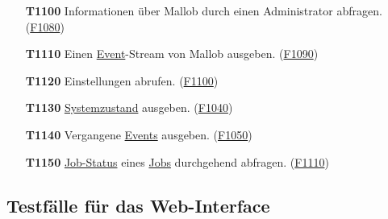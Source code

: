 \begin{itemize}
    \item[\textbf{T1100}] Informationen über \gls{Mallob} durch einen \gls{Administrator} abfragen. (\hyperref[FA:API:Abfragen der Informationen von Mallob]{F1080})
    
    \item[\textbf{T1110}] Einen \hyperref[B:Event]{Event}-\gls{Stream} von \gls{Mallob} ausgeben. (\hyperref[FA:API:Ausgeben eines Event-Streams von Mallob]{F1090})

    \item[\textbf{T1120}] Einstellungen abrufen. (\hyperref[FA:API:Abrufen von Einstellungen]{F1100})
    
    \item[\textbf{T1130}] \hyperref[B:Systemzustand]{Systemzustand} ausgeben. (\hyperref[FA:API:Ausgeben eines Systemzustandes]{F1040})
    
    \item[\textbf{T1140}] Vergangene \hyperref[B:Event]{Events} ausgeben. (\hyperref[FA:API:Ausgeben von vergangenen Events]{F1050})
    
    \item[\textbf{T1150}] \hyperref[B:Job-Status]{Job-Status} eines \hyperref[B:Jobs]{Jobs} durchgehend abfragen. (\hyperref[FA:API:Andauernde Abfrage des Ergebnisses eines Jobs]{F1110})
    
    

\end{itemize}

\subsection{Testfälle für das \gls{Web-Interface}}

